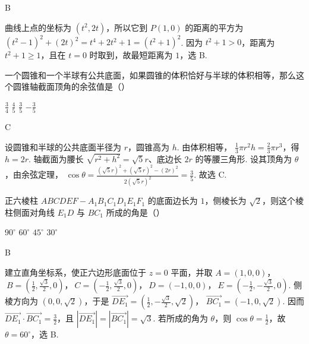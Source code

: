 \begin{answer}
B
\end{answer}

\begin{solution}
曲线上点的坐标为 \((t^2,2t)\)，所以它到 \(P(1,0)\) 的距离的平方为
\(\displaystyle(t^2-1)^2+(2t)^2=t^4+2t^2+1=(t^2+1)^2\). 因为 \(t^2+1>0\)，距离为 \(t^2+1\geqslant1\)，且在 \(t=0\) 时取到，故最短距离为 \(1\)，选 B.
\end{solution}

\begin{problem}
一个圆锥和一个半球有公共底面，如果圆锥的体积恰好与半球的体积相等，那么这个圆锥轴截面顶角的余弦值是（\quad）

\choices
    {\(\frac{3}{4}\)}
    {\(\frac{4}{5}\)}
    {\(\frac{3}{5}\)}
    {\(-\frac{3}{5}\)}
\end{problem}

\begin{answer}
C
\end{answer}

\begin{solution}
设圆锥和半球的公共底面半径为 \(r\)，圆锥高为 \(h\). 由体积相等，
\(\displaystyle\frac{1}{3}\pi r^2h=\frac{2}{3}\pi r^3\)，得 \(h=2r\). 轴截面为腰长 \(\sqrt{r^2+h^2}=\sqrt{5}r\)、底边长 \(2r\) 的等腰三角形. 设其顶角为 \(\theta\)，由余弦定理，
\(\displaystyle\cos\theta=\frac{(\sqrt{5}r)^2+(\sqrt{5}r)^2-(2r)^2}{2(\sqrt{5}r)^2}=\frac{3}{5}\). 故选 C.
\end{solution}

\begin{problem}
正六棱柱 \(ABCDEF - A_{1}B_{1}C_{1}D_{1}E_{1}F_{1}\) 的底面边长为 \(1\)，侧棱长为 \(\sqrt{2}\)，则这个棱柱侧面对角线 \(E_{1}D\) 与 \(BC_{1}\) 所成的角是（\quad）

\choices
    {\(90^{\circ}\)}
    {\(60^{\circ}\)}
    {\(45^{\circ}\)}
    {\(30^{\circ}\)}
\end{problem}

\begin{answer}
B
\end{answer}

\begin{solution}
建立直角坐标系，使正六边形底面位于 \(z=0\) 平面，并取
\(\displaystyle A=(1,0,0)\)，\(\ B=\left(\frac12,\frac{\sqrt3}{2},0\right)\)，\(\ C=\left(-\frac12,\frac{\sqrt3}{2},0\right)\)，\(\ D=(-1,0,0)\)，\(\ E=\left(-\frac12,-\frac{\sqrt3}{2},0\right)\). 侧棱方向为 \((0,0,\sqrt2)\)，于是
\(\displaystyle\overrightarrow{DE_1}=\left(\frac12,-\frac{\sqrt3}{2},\sqrt2\right)\)，
\(\displaystyle\overrightarrow{BC_1}=\left(-1,0,\sqrt2\right)\). 因而
\(\displaystyle\overrightarrow{DE_1}\cdot\overrightarrow{BC_1}=\frac32\)，且 \(\left|\overrightarrow{DE_1}\right|=\left|\overrightarrow{BC_1}\right|=\sqrt3\). 若所成的角为 \(\theta\)，则 \(\cos\theta=\frac{1}{2}\)，故 \(\theta=60^{\circ}\)，选 B.
\end{solution}

